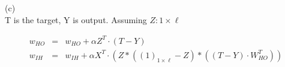 \documentclass{article} %
\begin{document}
(c) \\
T is the target, Y is output. Assuming $Z : 1 \times \ell$

\begin{equation}
    \begin{array}{rcl}
      	 w_{HO} & = & w_{HO} + \alpha Z^T \cdot (T - Y) \\
	 w_{IH} & = & w_{IH} + \alpha X^T  \cdot (  Z * ( (1)_{1 \times \ell} - Z)   * (   (T - Y) \cdot W_{HO}^T )     )
    \end{array}
\end{equation}
\end{document}
